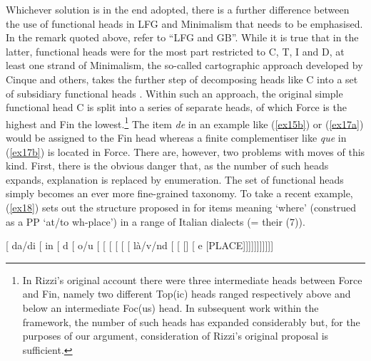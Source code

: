 \documentclass[output=paper]{langsci/langscibook}
\begin{document}
Whichever solution is in the end adopted, there is a further difference between
the use of functional heads in \gls{LFG} and Minimalism that needs to be emphasised. In the remark
quoted above, \citeauthor{Abeilleetal06} refer to \enquote{LFG and
\gls{GB}}. While it is true that in the latter, functional heads
were for the most part restricted to C, T, I and D, at least one strand of
Minimalism, the so-called cartographic approach developed by Cinque and others,
takes the further step of  decomposing heads like C into a set of subsidiary
functional heads \citep{Rizzi97}. Within such an approach,
the original simple functional head C is split into a
series of separate heads, of which Force is the highest and Fin the
lowest.\footnote{In Rizzi's original account there were three intermediate
    heads between Force and Fin, namely two different Top(ic) heads ranged
    respectively above and below an intermediate Foc(us) head. In subsequent
    work within the framework, the number of such heads has expanded
considerably but, for the purposes of our argument, consideration of Rizzi's
original proposal is sufficient.}  The item \emph{de} in an example like
(\ref{ex15b}) or (\ref{ex17a}) would be assigned to the Fin head whereas a
finite complementiser like \emph{que} in (\ref{ex17b}) is
located in Force.  There are, however, two problems with moves of this kind.
First, there is the obvious danger that, as the number of such heads expands,
explanation is replaced by enumeration. The set of functional heads simply
becomes an ever more fine-grained taxonomy. To take a recent example,
(\ref{ex18}) sets out the structure proposed in \cite{MunaPole14} for items
meaning `where' (construed as a PP `at/to wh-place') in a range of Italian
dialects (= their (7)).

{\sloppy
\begin{exe}
\ex\label{ex18}
{}[  da/di [  in
[  d [  o/u [
[  [ [
[  [  l\`a/v/nd
[  [  [] [ e [PLACE]]]]]]]]]]]
\end{exe}
}
\end{document}
